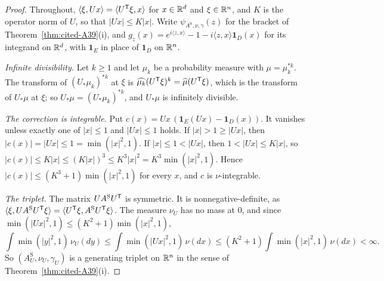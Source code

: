 \begin{proof}
\leanok
{}
Throughout, $\langle \xi, Ux\rangle = \langle U^{\mathsf{T}}\xi, x\rangle$ for $x \in \mathbb{R}^d$ and
$\xi \in \mathbb{R}^n$, and $K$ is the operator norm of $U$, so that $|Ux| \le K|x|$. Write
$\psi_{A^{\mathrm S},\nu,\gamma}(z)$ for the bracket of Theorem~\ref{thm:cited-A39}(i), and
$g_z(x) = e^{i\langle z,x\rangle} - 1 - i\langle z,x\rangle\mathbf{1}_D(x)$ for its integrand on
$\mathbb{R}^d$, with $\mathbf{1}_E$ in place of $\mathbf{1}_D$ on $\mathbb{R}^n$.

\emph{Infinite divisibility.} Let $k \ge 1$ and let $\mu_k$ be a probability measure with
$\mu = \mu_k^{*k}$. The transform of $(U_*\mu_k)^{*k}$ at $\xi$ is
$\widehat{\mu_k}(U^{\mathsf{T}}\xi)^k = \widehat\mu(U^{\mathsf{T}}\xi)$, which is the transform of $U_*\mu$ at $\xi$; so
$U_*\mu = (U_*\mu_k)^{*k}$, and $U_*\mu$ is infinitely divisible.

\emph{The correction is integrable.} Put $c(x) = Ux\,(\mathbf{1}_E(Ux) - \mathbf{1}_D(x))$. It
vanishes unless exactly one of $|x| \le 1$ and $|Ux| \le 1$ holds. If $|x| > 1 \ge |Ux|$, then
$|c(x)| = |Ux| \le 1 = \min(|x|^2, 1)$. If $|x| \le 1 < |Ux|$, then $1 < |Ux| \le K|x|$, so
$|c(x)| \le K|x| \le (K|x|)^3 \le K^3|x|^2 = K^3\min(|x|^2, 1)$. Hence
$|c(x)| \le (K^3 + 1)\min(|x|^2, 1)$ for every $x$, and $c$ is $\nu$-integrable.

\emph{The triplet.} The matrix $UA^{\mathrm S}U^{\mathsf{T}}$ is symmetric. It is nonnegative-definite, as
$\langle \xi, UA^{\mathrm S}U^{\mathsf{T}}\xi\rangle = \langle U^{\mathsf{T}}\xi, A^{\mathrm S}U^{\mathsf{T}}\xi\rangle$. The measure
$\nu_U$ has no mass at $0$, and since $\min(|Ux|^2, 1) \le (K^2 + 1)\min(|x|^2, 1)$,
\[
  \int \min(|y|^2, 1)\,\nu_U(dy) \le \int \min(|Ux|^2, 1)\,\nu(dx)
  \le (K^2 + 1)\int \min(|x|^2, 1)\,\nu(dx) < \infty .
\]
So $(A^{\mathrm S}_U, \nu_U, \gamma_U)$ is a generating triplet on $\mathbb{R}^n$ in the sense of
Theorem~\ref{thm:cited-A39}(i).


\end{proof}
